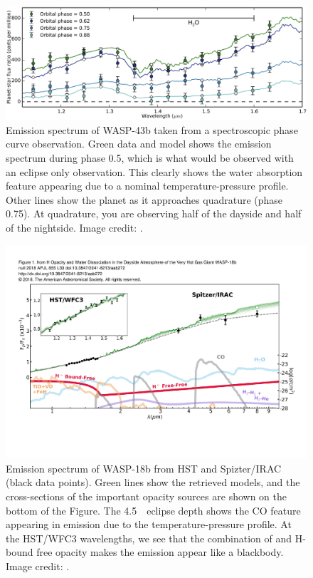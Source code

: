 \begin{figure}
    \centering
    \includegraphics[width = \linewidth]{Wasp-43b_water.png}
    \caption{Emission spectrum of WASP-43b taken from a spectroscopic phase curve observation. Green data and model shows the emission spectrum during phase 0.5, which is what would be observed with an eclipse only observation. This clearly shows the water absorption feature appearing due to a nominal temperature-pressure profile. Other lines show the planet as it approaches quadrature (phase 0.75). At quadrature, you are observing half of the dayside and half of the nightside. Image credit: \citet{Stevenson2014c}.}
    \label{int:fig:w43}
\end{figure}

\begin{figure}
    \centering
    \includegraphics[width = \linewidth]{arcangeli+18.pdf}
    \caption{Emission spectrum of WASP-18b from HST and Spizter/IRAC (black data points). Green lines show the retrieved models, and the cross-sections of the important opacity sources are shown on the bottom of the Figure. The 4.5~\um~\spitzer eclipse depth shows the CO feature appearing in emission due to the temperature-pressure profile. At the HST/WFC3 wavelengths, we see that the combination of  and H- bound free opacity makes the emission appear like a blackbody. Image credit: \citet{Arcangeli2018}. }
    \label{int:fig:w18}
\end{figure}

